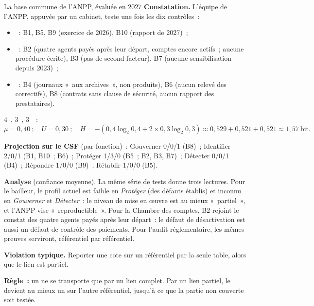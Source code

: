 \begin{boxlecture}{La base commune de l'ANPP, évaluée en 2027}
\textbf{Constatation.} L'équipe de l'ANPP, appuyée par un cabinet, teste
une fois les dix contrôles~:
\begin{itemize}
    \item \OUI{}~: B1, B5, B9 (exercice de 2026), B10 (rapport de 2027)~;
    \item \NON{}~: B2 (quatre agents payés après leur départ, comptes
          encore actifs~; aucune procédure écrite), B3 (pas de second
          facteur), B7 (aucune sensibilisation depuis 2023)~;
    \item \NEK{}~: B4 (journaux «~aux archives~», non produits), B6
          (aucun relevé des correctifs), B8 (contrats sans clause de
          sécurité, aucun rapport des prestataires).
\end{itemize}
4~\OUI{}, 3~\NON{}, 3~\NEK{}~:
\[
\mu = 0{,}40~;\quad U = 0{,}30~;\quad
H = -(0{,}4\log_2 0{,}4 + 2 \times 0{,}3\log_2 0{,}3)
  \approx 0{,}529 + 0{,}521 + 0{,}521 \approx 1{,}57~\text{bit}.
\]

\textbf{Projection sur le CSF} (par fonction)~: Gouverner 0/0/1 (B8)~;
Identifier 2/0/1 (B1, B10~; B6)~; Protéger 1/3/0 (B5~; B2, B3, B7)~;
Détecter 0/0/1 (B4)~; Répondre 1/0/0 (B9)~; Rétablir 1/0/0 (B5).

\medskip
\textbf{Analyse} (confiance moyenne). La même série de tests donne trois
lectures. Pour le bailleur, le profil actuel est faible en
\emph{Protéger} (des défauts établis) et inconnu en \emph{Gouverner} et
\emph{Détecter}~: le niveau de mise en œuvre est au mieux «~partiel~», et
l'ANPP vise «~reproductible~». Pour la Chambre des comptes, B2 rejoint le
constat des quatre agents payés après leur départ~: le défaut de
désactivation est aussi un défaut de contrôle des paiements. Pour
l'audit réglementaire, les mêmes preuves serviront, référentiel par
référentiel.

\medskip
\hfill{}
\end{boxlecture}

\begin{boxalert}
\textbf{Violation typique.} Reporter une cote sur un référentiel par la
seule table, alors que le lien est partiel.

\smallskip
\textbf{Règle~:} un \OUI{} ne se transporte que par un lien complet. Par un
lien partiel, le \OUI{} devient au mieux un \NEK{} sur l'autre référentiel,
jusqu'à ce que la partie non couverte soit testée.
\end{boxalert}

